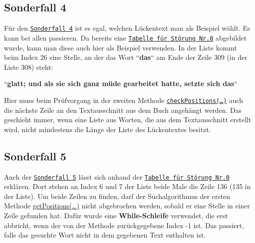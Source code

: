 \documentclass[a4paper, 10pt, ngerman]{scrartcl}
\begin{document}
\subsection{Sonderfall 4}\label{sec:vierterSonderfall}
Für den \hyperref[sonderfallVier]{\texttt{Sonderfall 4}} ist es egal,
welchen Lückentext man als Beispiel wählt.
Es kann bei allen passieren.
Da bereits eine \hyperref[tab:listeStoerung0]{\texttt{Tabelle für Störung Nr.0}} abgebildet wurde,
kann man diese auch hier als Beispiel verwenden.
In der Liste kommt beim Index 26 eine Stelle,
an der das Wort ``\textbf{das}`` am Ende der Zeile 309
(in der Liste 308)
steht:

``\textbf{glatt; und als sie sich ganz müde gearbeitet hatte, setzte sich das}``

Hier muss beim Prüfvorgang in der zweiten Methode \hyperref[sec:checkPositions()]{\texttt{checkPositions(\ldots)}} auch die nächste Zeile an den Textausschnitt aus dem Buch angehängt werden.
Das geschieht immer,
wenn eine Liste aus Worten,
die aus dem Textausschnitt erstellt wird,
nicht mindestens die Länge der Liste des Lückentextes besitzt.

\subsection{Sonderfall 5}\label{sec:fuenfterSonderfall}
Auch der \hyperref[sonderfallFuenf]{\texttt{Sonderfall 5}} lässt sich anhand der \hyperref[tab:listeStoerung0]{\texttt{Tabelle für Störung Nr.0}} erklären.
Dort stehen an Index 6 und 7 der Liste beide Male die Zeile 136 (135 in der Liste).
Um beide Zeilen zu finden,
darf der Suchalgorithmus der ersten Methode \hyperref[sec:getPosition()]{getPositions(\ldots)} nicht abgebrochen werden,
sobald er eine Stelle in einer Zeile gefunden hat.
Dafür wurde eine \textbf{While-Schleife} verwendet,
die erst abbricht,
wenn der von der Methode zurückgegebene Index -1 ist.
Das passiert,
falls das gesuchte Wort nicht in dem gegebenen Text enthalten ist.
\end{document}
